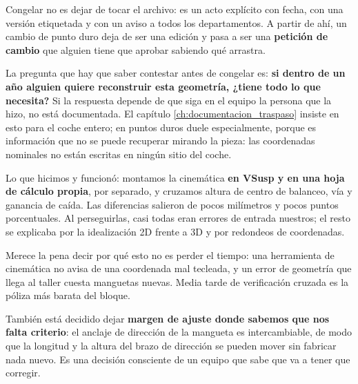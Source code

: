 Congelar no es dejar de tocar el archivo: es un acto explícito con fecha, con
una versión etiquetada y con un aviso a todos los departamentos. A partir de
ahí, un cambio de punto duro deja de ser una edición y pasa a ser una
\textbf{petición de cambio} que alguien tiene que aprobar sabiendo qué arrastra.

\begin{clave}
La pregunta que hay que saber contestar antes de congelar es: \textbf{si dentro
de un año alguien quiere reconstruir esta geometría, ¿tiene todo lo que
necesita?} Si la respuesta depende de que siga en el equipo la persona que la
hizo, no está documentada. El capítulo \ref{ch:documentacion_traspaso} insiste
en esto para el coche entero; en puntos duros duele especialmente, porque es
información que no se puede recuperar mirando la pieza: las coordenadas
nominales no están escritas en ningún sitio del coche.
\end{clave}


\begin{caso}
Lo que hicimos y funcionó: montamos la cinemática \textbf{en VSusp y en una hoja
de cálculo propia}, por separado, y cruzamos altura de centro de balanceo, vía y
ganancia de caída. Las diferencias salieron de pocos milímetros y pocos puntos
porcentuales. Al perseguirlas, casi todas eran errores de entrada nuestros; el
resto se explicaba por la idealización 2D frente a 3D y por redondeos de
coordenadas.

Merece la pena decir por qué esto no es perder el tiempo: una herramienta de
cinemática no avisa de una coordenada mal tecleada, y un error de geometría que
llega al taller cuesta manguetas nuevas. Media tarde de verificación cruzada es
la póliza más barata del bloque.

También está decidido dejar \textbf{margen de ajuste donde sabemos que nos
falta criterio}: el anclaje de dirección de la mangueta es intercambiable, de
modo que la longitud y la altura del brazo de dirección se pueden mover sin
fabricar nada nuevo. Es una decisión consciente de un equipo que sabe que va a
tener que corregir.

\medskip
{}
\end{caso}

